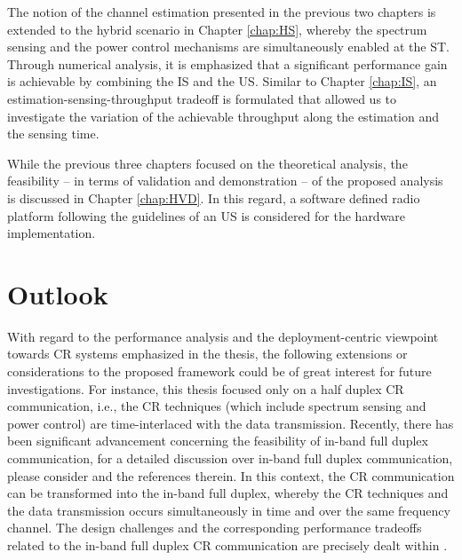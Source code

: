The notion of the channel estimation presented in the previous two chapters is extended to the hybrid scenario in Chapter \ref{chap:HS}, whereby the spectrum sensing and the power control mechanisms are simultaneously enabled at the ST. Through numerical analysis, it is emphasized that a significant performance gain is achievable by combining the IS and the US. Similar to Chapter \ref{chap:IS}, an estimation-sensing-throughput tradeoff is formulated that allowed us to investigate the variation of the achievable throughput along the estimation and the sensing time. 

While the previous three chapters focused on the theoretical analysis, the feasibility -- in terms of validation and demonstration -- of the proposed analysis is discussed in Chapter \ref{chap:HVD}. In this regard, a software defined radio platform following the guidelines of an US is considered for the hardware implementation. 


\section{Outlook}
With regard to the performance analysis and the deployment-centric viewpoint towards CR systems emphasized in the thesis, the following extensions or considerations to the proposed framework could be of great interest for future investigations. For instance, this thesis focused only on a half duplex CR communication, i.e., the CR techniques (which include spectrum sensing and power control) are time-interlaced with the data transmission. Recently, there has been significant advancement concerning the feasibility of in-band full duplex communication, for a detailed discussion over in-band full duplex communication, please consider \cite{Bhar13, Sab14, Liu15} and the references therein. In this context, the CR communication can be transformed into the in-band full duplex, whereby the CR techniques and the data transmission occurs simultaneously in time and over the same frequency channel. The design challenges and the corresponding performance tradeoffs related to the in-band full duplex CR communication are precisely dealt within \cite{Liao15, Kim15}. 

